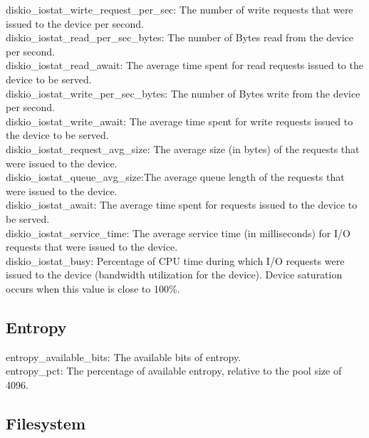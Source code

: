\documentclass{iosart2c}
\begin{document}
diskio\_iostat\_wirte\_request\_per\_sec: The number of write requests that were issued to the device per second.\\

diskio\_iostat\_read\_per\_sec\_bytes: The number of Bytes read from the device per second.\\

diskio\_iostat\_read\_await: The average time spent for read requests issued to the device to be served.\\

diskio\_iostat\_write\_per\_sec\_bytes:  The number of Bytes write from the device per second.\\

diskio\_iostat\_write\_await: The average time spent for write requests issued to the device to be served.\\

diskio\_iostat\_request\_avg\_size: The average size (in bytes) of the requests that were issued to the device.\\

diskio\_iostat\_queue\_avg\_size:The average queue length of the requests that were issued to the device.\\

diskio\_iostat\_await: The average time spent for requests issued to the device to be served.\\

diskio\_iostat\_service\_time: The average service time (in milliseconds) for I/O requests that were issued to the device.\\

diskio\_iostat\_busy: Percentage of CPU time during which I/O requests were issued to the device (bandwidth utilization for the device). Device saturation occurs when this value is close to 100\%.\\


\subsection{Entropy}

entropy\_available\_bits: The available bits of entropy.\\

entropy\_pct: The percentage of available entropy, relative to the pool size of 4096.\\



\subsection{Filesystem}
\end{document}
